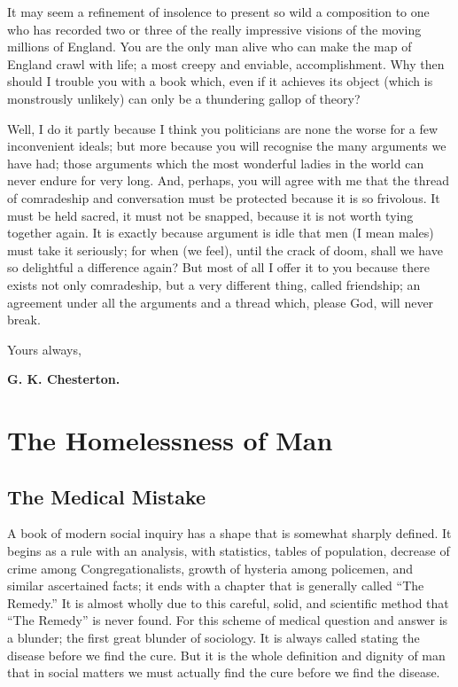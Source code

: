 \documentclass{book}
\begin{document}
It may seem a refinement of insolence to present so wild a composition to one who has recorded two or three of the really impressive visions of the moving millions of England. You are the only man alive who can make the map of England crawl with life; a most creepy and enviable, accomplishment. Why then should I trouble you with a book which, even if it achieves its object (which is monstrously unlikely) can only be a thundering gallop of theory?

Well, I do it partly because I think you politicians are none the worse for a few inconvenient ideals; but more because you will recognise the many arguments we have had; those arguments which the most wonderful ladies in the world can never endure for very long. And, perhaps, you will agree with me that the thread of comradeship and conversation must be protected because it is so frivolous. It must be held sacred, it must not be snapped, because it is not worth tying together again. It is exactly because argument is idle that men (I mean males) must take it seriously; for when (we feel), until the crack of doom, shall we have so delightful a difference again? But most of all I offer it to you because there exists not only comradeship, but a very different thing, called friendship; an agreement under all the arguments and a thread which, please God, will never break.

Yours always,

\textbf{G. K. Chesterton.}

\setcounter{chapter}{0}
\part{The Homelessness of Man}
\label{chapter-1}
\chapter{The Medical Mistake}
\label{chapter-2}
A book of modern social inquiry has a shape that is somewhat sharply defined. It begins as a rule with an analysis, with statistics, tables of population, decrease of crime among Congregationalists, growth of hysteria among policemen, and similar ascertained facts; it ends with a chapter that is generally called “The Remedy.” It is almost wholly due to this careful, solid, and scientific method that “The Remedy” is never found. For this scheme of medical question and answer is a blunder; the first great blunder of sociology. It is always called stating the disease before we find the cure. But it is the whole definition and dignity of man that in social matters we must actually find the cure before we find the disease.
\end{document}
